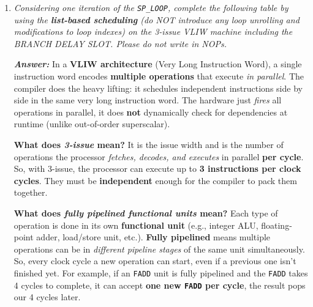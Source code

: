 \begin{enumerate}
    \item \emph{Considering one iteration of the \texttt{SP\_LOOP}, complete the following table by using the \textbf{list-based scheduling} (do NOT introduce any loop unrolling and modifications to loop indexes) on the 3-issue VLIW machine including the BRANCH DELAY SLOT. Please do not write in NOPs.}

    \textcolor{Green3}{\textbf{\emph{Answer:}}} In a \textbf{VLIW architecture} (Very Long Instruction Word), a single instruction word encodes \textbf{multiple operations} that execute \emph{in parallel}. The compiler does the heavy lifting: it schedules independent instructions side by side in the same very long instruction word. The hardware just \emph{fires} all operations in parallel, it does \textbf{not} dynamically check for dependencies at runtime (unlike out-of-order superscalar).

    \highspace
    \textcolor{Green3}{ \textbf{What does \emph{3-issue} mean?}} It is the issue width and is the number of operations the processor \emph{fetches, decodes, and executes} in parallel \textbf{per cycle}. So, with 3-issue, the processor can execute up to \textbf{3 instructions per clock cycles}. They must be \textbf{independent} enough for the compiler to pack them together.

    \highspace
    \textcolor{Green3}{ \textbf{What does \emph{fully pipelined functional units} mean?}} Each type of operation is done in its own \textbf{functional unit} (e.g., integer ALU, floating-point adder, load/store unit, etc.). \textbf{Fully pipelined} means multiple operations can be in \emph{different pipeline stages} of the same unit simultaneously. So, every clock cycle a new operation can start, even if a previous one isn't finished yet. For example, if an \texttt{FADD} unit is fully pipelined and the \texttt{FADD} takes 4 cycles to complete, it can accept \textbf{one new \texttt{FADD} per cycle}, the result pops our 4 cycles later.


\end{enumerate}
